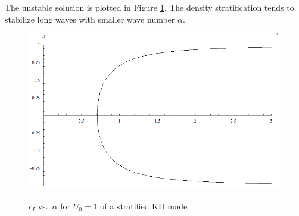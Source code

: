 The unstable solution is plotted in Figure \ref{kh2}. The density
stratification tends to stabilize long waves with smaller wave
number $\alpha$.
\begin{figure}[htpb]
  \centering
  \includegraphics[width=0.9\textheight]{kh2.png}\\
  \caption{$c_I$ vs.~$\alpha$ for $U_0=1$ of a stratified KH mode}\label{kh2}
\end{figure}
